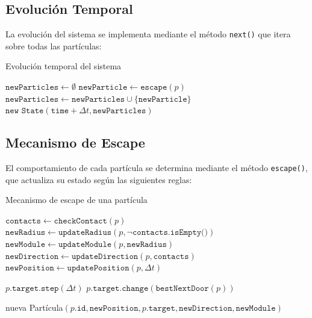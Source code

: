 \documentclass[12pt]{article}
\begin{document}
\subsection{Evolución Temporal}
La evolución del sistema se implementa mediante el método \texttt{next()} que itera sobre todas las partículas:

\begin{algorithm}[H]
\caption{Evolución temporal del sistema}
\begin{algorithmic}[1]
\State $\texttt{newParticles} \leftarrow \emptyset$
    \State $\texttt{newParticle} \leftarrow \texttt{escape}(p)$
        \State $\texttt{newParticles} \leftarrow \texttt{newParticles} \cup \{\texttt{newParticle}\}$
    \EndIf
\EndFor
\State \Return $\texttt{new State}(\texttt{time} + \Delta t, \texttt{newParticles})$
\end{algorithmic}
\end{algorithm}

\subsection{Mecanismo de Escape}
El comportamiento de cada partícula se determina mediante el método \texttt{escape()}, que actualiza su estado según las siguientes reglas:

\begin{algorithm}[H]
\caption{Mecanismo de escape de una partícula}
\begin{algorithmic}[1]
    \State $\texttt{contacts} \leftarrow \texttt{checkContact}(p)$
    \State $\texttt{newRadius} \leftarrow \texttt{updateRadius}(p, \neg \texttt{contacts.isEmpty()})$
    \State $\texttt{newModule} \leftarrow \texttt{updateModule}(p, \texttt{newRadius})$
    \State $\texttt{newDirection} \leftarrow \texttt{updateDirection}(p, \texttt{contacts})$
    \State $\texttt{newPosition} \leftarrow \texttt{updatePosition}(p, \Delta t)$
    
    \State $p.\texttt{target.step}(\Delta t)$
        \State $p.\texttt{target.change}(\texttt{bestNextDoor}(p))$
    \EndIf
    
    \State \Return nueva Partícula$(p.\texttt{id}, \texttt{newPosition}, p.\texttt{target}, \texttt{newDirection}, \texttt{newModule})$
\EndFunction
\end{algorithmic}
\end{algorithm}
\end{document}
